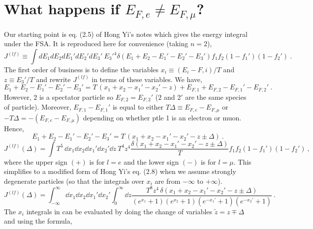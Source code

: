 \section{What happens if $E_{F,e} \neq E_{F,\mu}$?}
\newcommand{\Li}[2]{\mathrm{Li}_{#1}(#2)}
Our starting point is eq. (2.5) of Hong Yi's notes which gives the energy integral under the FSA. It is reproduced here for convenience (taking $n=2$),
\begin{equation}
    J^{(lf)} \equiv \int dE_1 dE_2 dE_1' dE_2' dE_3' ~ {E_3'}^{4} \delta(E_1+E_2-E_1'-E_2'-E_3') f_1 f_2 (1-f_1')(1-f_2') ~.
\end{equation}
The first order of business is to define the variables $x_i \equiv (E_i - {F,i}) / T$ and $z \equiv E_{3}' / T$ and rewrite $J^{(lf)}$ in terms of these variables.
We have,
\begin{equation}
    E_1+E_2-E_1'-E_2'-E_3' = T\,(x_1+x_2-x_1'-x_2'- z) + E_{F,1} + E_{F,2} - E_{F,1}' - E_{F,2}'~.
\end{equation}
However, $2$ is a spectator particle so $E_{F,2} = E_{F,2}'$ ($2$ and $2'$ are the same species of particle). 
Moreover, $E_{F,1} - E_{F,1}'$ is equal to either $T \Delta \equiv E_{F,e} - E_{F,\mu}$ or $- T \Delta = - (E_{F,e} - E_{F,\mu})$ depending on whether ptle 1 is an electron or muon. 
Hence,
\begin{equation}
    E_1+E_2-E_1'-E_2'-E_3' = T\,(x_1+x_2-x_1'-x_2'- z \pm \Delta) ~.
\end{equation}
\begin{equation}
    J^{(lf)}(\Delta) = \int T^5 \,\dd x_1 \dd x_2 \dd x_1' \dd x_2' \dd z ~ T^4 {z}^{4} 
    \frac{\delta(x_1 + x_2 - x_1' - x_2' - z \pm \Delta)}{T}  f_1 f_2 (1-f_1')(1-f_2') ~,
\end{equation}
where the upper sign $(+)$ is for $l = e$ and the lower sign $(-)$ is for $l = \mu$.
This simplifies to a modified form of Hong Yi's eq. (2.8) when we assume strongly degenerate particles (so that the integrals over $x_i$ are from $-\infty$ to $+\infty$).
\begin{equation}
    \label{eq:hong-yi-2.8}
    J^{(lf)}(\Delta) = 
    \int_{-\infty}^\infty \! \dd x_1
     \dd x_2
     \dd x_1'
     \dd x_2'
    \int_0^\infty \dd z
    \frac{
        T^{8} z^{4} \, \delta(x_1 + x_2 - x_1' - x_2' - z  \pm \Delta)
    }
    {
        (e^{x_1} + 1)
        (e^{x_2} + 1)
        (e^{-x_1'} + 1)
        (e^{-x_2'} + 1)
    } ~.
\end{equation}
The $x_i$ integrals in  can be evaluated by doing the change of variables $\tilde{z} = z \mp \Delta$ and using the formula,
